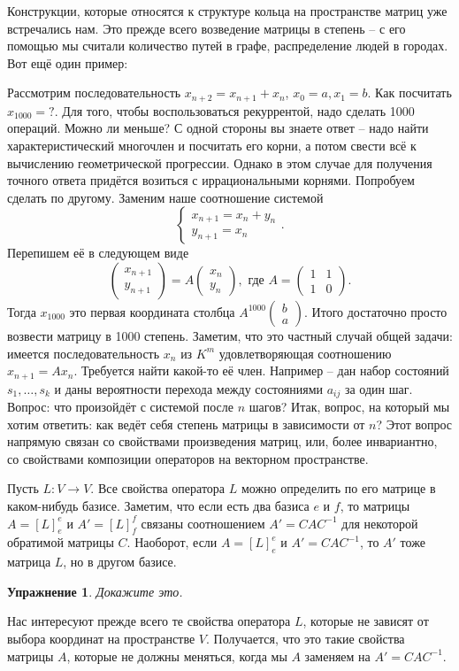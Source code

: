 \documentclass[10pt,a4paper,oneside]{book}
\newtheorem{uprz}{\color{violet!100!black} Упражнение}
\theoremstyle{definition}
\def\pmat{\begin{pmatrix}}
\def\epmat{\end{pmatrix}}
\def\upr{\begin{uprz}}
\def\eupr{\end{uprz}}
\begin{document}
Конструкции, которые относятся к структуре кольца на пространстве матриц уже встречались нам. Это прежде всего возведение матрицы в степень -- с его помощью мы считали количество путей в графе, распределение людей в городах. Вот ещё один пример:

Рассмотрим последовательность $x_{n+2}=x_{n+1}+x_{n}$, $x_0=a,x_1=b$. Как посчитать $x_{1000}=?$. Для того, чтобы воспользоваться рекуррентой, надо сделать 1000 операций. Можно ли меньше? С одной стороны вы знаете ответ -- надо найти характеристический многочлен и посчитать его корни, а потом свести всё к вычислению геометрической прогрессии.  Однако в этом случае для получения точного ответа придётся возиться с  иррациональными корнями. Попробуем сделать по другому. Заменим наше соотношение системой
$$ \begin{cases} x_{n+1}=x_n+y_n \\
y_{n+1}=x_{n}
\end{cases}.$$
Перепишем её в следующем виде
$$ \pmat x_{n+1}\\ y_{n+1}\epmat = A \pmat  x_{n}\\ y_n \epmat, \text{ где } A=\pmat 1& 1\\ 1& 0 \epmat.$$
Тогда  $x_{1000}$ это первая координата столбца $A^{1000} \pmat b\\ a\epmat $. Итого достаточно просто возвести матрицу в 1000 степень. Заметим, что это частный случай общей задачи: имеется последовательность $x_n$ из $K^m$ удовлетворяющая соотношению $x_{n+1}=Ax_n$. Требуется найти какой-то её член. Например -- дан  набор состояний $s_1,\dots,s_k$ и даны вероятности перехода между состояниями $a_{ij}$ за один шаг. Вопрос: что произойдёт с системой после $n$ шагов?
Итак, вопрос, на который мы хотим ответить: как ведёт себя степень матрицы в зависимости от $n$? Этот вопрос напрямую связан со  свойствами произведения матриц, или, более инвариантно,  со свойствами композиции операторов на векторном пространстве. 


Пусть $L \colon V \to V$. Все свойства оператора $L$ можно определить по его матрице в каком-нибудь базисе. Заметим, что если есть два базиса $e$ и $f$, то матрицы $A=[L]_e^e$ и $A'=[L]_f^f$ связаны соотношением $A'=CAC^{-1}$ для некоторой обратимой матрицы $C$. Наоборот, если $A=[L]_e^e$  и $A'=CAC^{-1}$, то $A'$  тоже матрица $L$, но в другом базисе.

\upr Докажите это.
\eupr

Нас интересуют прежде всего те свойства оператора $L$, которые не зависят  от выбора координат на пространстве $V$. Получается, что это такие свойства матрицы $A$, которые не должны меняться, когда мы $A$ заменяем на $A'=CAC^{-1}$.  
\end{document}
